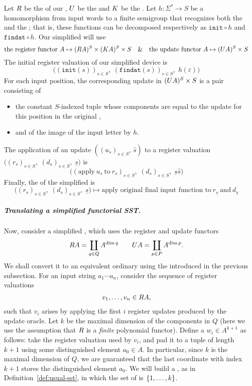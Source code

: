 Let $\functorr$ be the  of our \functorialsst, $\functoru$ be the  and $\functork$ be the . Let $h\colon \Sigma^* \to S$ be a homomorphism from input words to a finite semigroup that recognizes both the  and the ; that is, these functions can be decomposed respectively as $\mathtt{init}\circ h$ and $\mathtt{findat}\circ h$. Our simplified \functorialsst will use
\[ \text{the register functor}\ A \mapsto (\functorr A)^S \times (\functork A)^S \times S \quad\text{\&}\quad \text{the update functor}\ A \mapsto (\functoru A)^S \times S \]
The initial register valuation of our simplified device is
\[ \big((\mathtt{init}(s))_{s\in S},\; (\mathtt{findat}(s))_{s\in S},\; h(\varepsilon)\big) \]
For each input position, the corresponding update in $(\functoru A)^S \times S$ is a pair consisting of
\begin{itemize}
  \item the constant $S$-indexed tuple whose components are equal to the update for this position in the original \functorialsst,
  \item and of the image of the input letter by $h$.
\end{itemize}
The application of an update $((u_s)_{s\in S},\, \widehat{s})$ to a register valuation $\big((r_s)_{s\in S},\; (d_s)_{s\in S},\; \underline{s}\big)$ is
\[ \big((\text{apply}\ u_s\ \text{to}\ r_s)_{s\in S},\; (d_s)_{s\in S},\; \underline{s}\widehat{s}\big) \]
Finally, the  of the simplified \functorialsst is
\[ \big((r_s)_{s\in S},\; (d_s)_{s\in S},\; \underline{s}\big) \mapsto \text{apply original final input function to}\ r_{\underline{s}}\ \text{and}\ d_{\underline{s}}  \]

\subparagraph{Translating a simplified functorial SST.}

Now, consider a simplified , which uses the register and update functors 
\begin{align*} 
\functorr A = \coprod_{q \in Q} A^{\dim q} \qquad 
\functoru A = \coprod_{p \in P} A^{\dim p}.
\end{align*}
We shall convert it to an equivalent ordinary \sst using the  introduced in the previous subsection.
For an input string $a_1 \cdots a_n$, consider the sequence of register valuations 
\begin{align*}
v_1,\ldots,v_n \in \functorr A,
\end{align*}
such that $v_i$ arises by applying the first $i$ register updates produced by the update oracle. Let $k$ be the maximal dimension of the components in $Q$ (here we use the assumption that $\functorr$ is a \emph{finite} polynomial functor). Define a  $w_i \in A^{k+1}$ as follows: take the register valuation used by $v_i$, and pad it to a tuple of length  $k+1$ using some distinguished element $a_0 \in A$. In particular, since $k$ is the maximal dimension of $Q$, we are guaranteed that the last coordinate with index $k+1$ stores the distinguished element $a_0$. We will build a , as in Definition~\ref{def:usual-sst}, in which the set of  is $\{1,\ldots,k\}$. 

